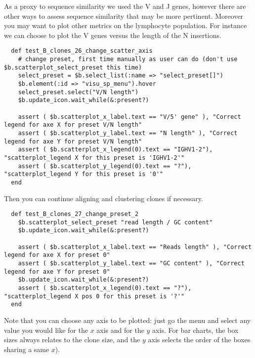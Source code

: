 As a proxy to sequence similarity we used the V and J genes, however there are
other ways to assess sequence similarity that may be more pertinent.
Moreover you may want to plot other metrics on the lymphocyte population.
%
For instance we can choose to plot the V genes versus the length of the N
insertions.
\begin{verbatim}
  def test_B_clones_26_change_scatter_axis
    # change preset, first time manually as user can do (don't use $b.scatterplot_select_preset this time) 
    select_preset = $b.select_list(:name => "select_preset[]")
    $b.element(:id => "visu_sp_menu").hover
    select_preset.select("V/N length")
    $b.update_icon.wait_while(&:present?)

    assert ( $b.scatterplot_x_label.text == "V/5' gene" ), "Correct legend for axe X for preset V/N length"
    assert ( $b.scatterplot_y_label.text == "N length" ), "Correct legend for axe Y for preset V/N length"
    assert ( $b.scatterplot_x_legend(0).text == "IGHV1-2"), "scatterplot_legend X for this preset is 'IGHV1-2'"
    assert ( $b.scatterplot_y_legend(0).text == "?"), "scatterplot_legend Y for this preset is '0'"
  end
\end{verbatim}

Then you can continue aligning and clustering clones if necessary.

\begin{verbatim}
  def test_B_clones_27_change_preset_2
    $b.scatterplot_select_preset "read length / GC content"
    $b.update_icon.wait_while(&:present?)

    assert ( $b.scatterplot_x_label.text == "Reads length" ), "Correct legend for axe X for preset 0"
    assert ( $b.scatterplot_y_label.text == "GC content" ), "Correct legend for axe Y for preset 0"
    $b.update_icon.wait_while(&:present?)
    assert ( $b.scatterplot_x_legend(0).text == "?"), "scatterplot_legend X pos 0 for this preset is '?'"
  end
\end{verbatim}

Note that you can choose any axis to be plotted: just go the  menu and
select any value you would like for the $x$ axis and for the $y$ axis.
For bar charts, the box sizes always relates to the clone size,
and the $y$ axis selects the order of the boxes sharing a same $x$).

